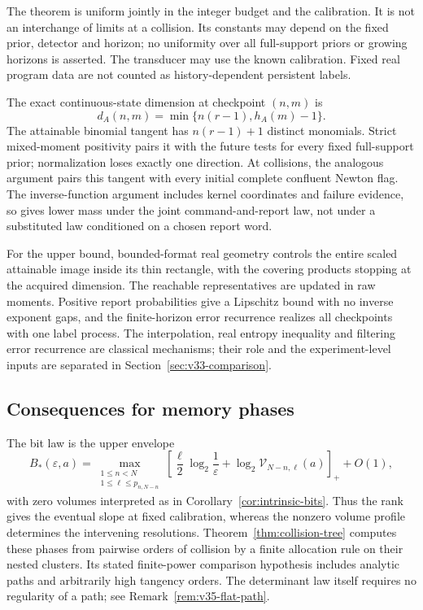 

The theorem is uniform jointly in the integer budget and the calibration.
It is not an interchange of limits at a collision. Its constants may
depend on the fixed prior, detector and horizon; no uniformity over all
full-support priors or growing horizons is asserted. The transducer
may use the known calibration. Fixed real program data are not counted
as history-dependent persistent labels.

The exact continuous-state dimension at checkpoint $(n,m)$ is
\[
                 d_A(n,m)=\min\{n(r-1),h_A(m)-1\}.
\]
The attainable binomial tangent has $n(r-1)+1$ distinct monomials.
Strict mixed-moment positivity pairs it with the future tests for every
fixed full-support prior; normalization loses exactly one direction.
At collisions, the analogous argument pairs this tangent with every
initial complete confluent Newton flag. The inverse-function argument
includes kernel coordinates and failure evidence, so gives lower mass
under the joint command-and-report law, not under a substituted law
conditioned on a chosen report word.

For the upper bound, bounded-format real geometry controls the entire
scaled attainable image inside its thin rectangle, with the covering
products stopping at the acquired dimension. The reachable representatives
are updated in raw moments. Positive report probabilities give a
Lipschitz bound with no inverse exponent gaps, and the finite-horizon
error recurrence realizes all checkpoints with one label process.
The interpolation, real entropy inequality and filtering error recurrence
are classical mechanisms; their role and the experiment-level inputs
are separated in Section~\ref{sec:v33-comparison}.

\subsection{Consequences for memory phases}
The bit law is the upper envelope
\[
 B_*(\varepsilon,a)=
 \max_{\substack{1\le n<N\\1\le\ell\le p_{n,N-n}}}
 \left[\frac\ell2\log_2\frac1\varepsilon+
             \log_2\mathcal V_{N-n,\ell}(a)\right]_++O(1),
\]
with zero volumes interpreted as in Corollary~\ref{cor:intrinsic-bits}.
Thus the rank gives the eventual slope at fixed calibration, whereas
the nonzero volume profile determines the intervening resolutions.
Theorem~\ref{thm:collision-tree} computes these phases from pairwise
orders of collision by a finite allocation rule on their nested clusters.
Its stated finite-power comparison hypothesis includes analytic paths
and arbitrarily high tangency orders. The determinant law itself requires
no regularity of a path; see Remark~\ref{rem:v35-flat-path}.

